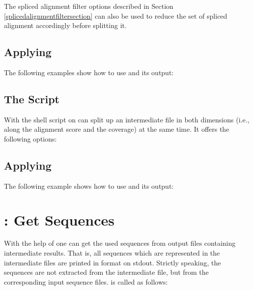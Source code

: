 \documentclass[11pt,a4paper,titlepage]{article}
\begin{document}
The spliced alignment filter options described in Section \ref{splicedalignmentfiltersection} can also be used to reduce the set of spliced alignment accordingly before splitting it.


\subsection{Applying \Callgthsplit}

The following examples show how to use \Callgthsplit and its output:




\subsection{The Script \Callgthsplittwodim}
With the shell script \Callgthsplittwodim on can split up an intermediate file in both dimensions (i.e., along the alignment score and the coverage) at the same time. It offers the following options:

\begin{Justshowoptions}
\end{Justshowoptions}


\subsection{Applying \Callgthsplittwodim}

The following example shows how to use \Callgthsplittwodim and its output:






\section{\Callgthgetseq: Get \Fasta Sequences} 
\label{gthextractfastasection}

With the help of \Callgthgetseq one can get the used \Fasta sequences from
\Gth output files containing intermediate results. That is, all
sequences which are represented in the intermediate files are printed in
\Fasta format on stdout. Strictly speaking, the sequences are not extracted from
the intermediate file, but from the corresponding input sequence files.
\Callgthgetseq is called as follows:
\end{document}

